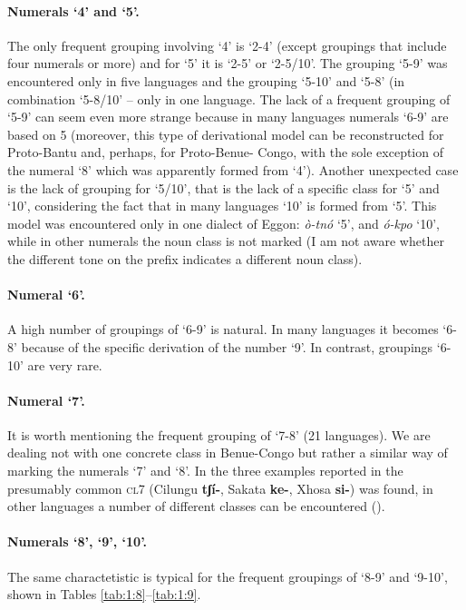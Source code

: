 \paragraph*{Numerals ‘4’ and ‘5’.} The only frequent grouping involving ‘4’ is ‘2-4’ (except groupings that include four numerals or more) and for ‘5’ it is ‘2-5’ or ‘2-5/10’. The grouping ‘5-9’ was encountered only in five languages and the grouping ‘5-10’ and ‘5-8’ (in combination ‘5-8/10’ – only in one language. The lack of a frequent grouping of ‘5-9’ can seem even more strange because in many languages numerals ‘6-9’ are based on 5 (moreover, this type of derivational model can be reconstructed for Proto-Bantu and, perhaps, for Proto-Benue- Congo, with the sole exception of the numeral ‘8’ which was apparently formed from ‘4’). Another unexpected case is the lack of grouping for ‘5/10’, that is the lack of a specific class for ‘5’ and ‘10’, considering the fact that in many languages ‘10’ is formed from ‘5’. This model was encountered only in one dialect of Eggon: \textit{ò-tnó} ‘5’, and \textit{ó-kpo} ‘10’, while in other numerals the noun class is not marked (I am not aware whether the different tone on the prefix indicates a different noun class). 

\paragraph*{Numeral ‘6’.} A high number of groupings of ‘6-9’ is natural. In many languages it becomes ‘6-8’ because of the specific derivation of the number ‘9’. In contrast, groupings ‘6-10’ are very rare. 

\paragraph*{Numeral ‘7’.} It is worth mentioning the frequent grouping of ‘7-8’ (21 languages). We are dealing not with one concrete class in Benue-Congo but rather a similar way of marking the numerals ‘7’ and ‘8’. In the three examples reported in  the presumably common \textsc{cl}7 (Cilungu \textbf{tʃí-}, Sakata \textbf{ke-}, Xhosa \textbf{si-}) was found, in other languages a number of different classes can be encountered (). 

\paragraph*{Numerals ‘8’, ‘9’, ‘10’.} The same charactetistic is typical for the frequent groupings of ‘8-9’ and ‘9-10’, shown in Tables \ref{tab:1:8}--\ref{tab:1:9}. 


